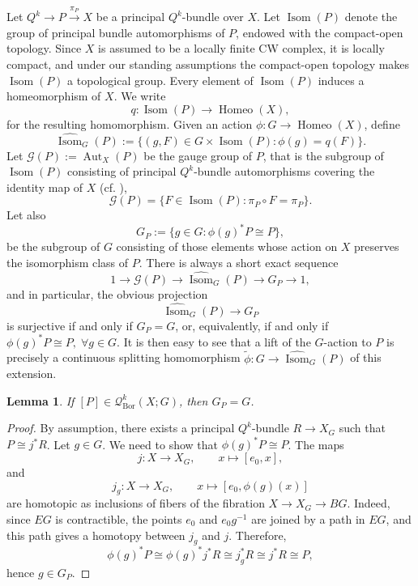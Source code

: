\documentclass[11pt,a4paper]{article}
\numberwithin{equation}{section}
\newtheorem{lemma}[definition]{Lemma}
\theoremstyle{named}
\begin{document}
Let $Q^k\longrightarrow P\overset{\pi_P}{\longrightarrow}X$ be a principal \(Q^k\)-bundle over $X$. Let $\operatorname{Isom}(P)$ denote the group of principal bundle automorphisms of \(P\), endowed with the compact-open topology. Since \(X\) is assumed to be a locally finite CW complex, it is locally compact, and under our standing assumptions the compact-open topology makes \(\operatorname{Isom}(P)\) a topological group. Every element of \(\operatorname{Isom}(P)\) induces a homeomorphism of \(X\). We write
\[
q:\operatorname{Isom}(P)\longrightarrow \operatorname{Homeo}(X),
\]
for the resulting homomorphism. Given an action $\phi:G\longrightarrow \operatorname{Homeo}(X)$,
define
\[
\widehat{\operatorname{Isom}}_G(P)
:=
\{(g,F)\in G\times \operatorname{Isom}(P):\phi(g)=q(F)\}.
\]
Let $\mathcal G(P):=\operatorname{Aut}_X(P)$
be the gauge group of \(P\), that is the subgroup of \(\operatorname{Isom}(P)\) consisting of principal \(Q^k\)-bundle automorphisms covering the identity map of \(X\) (cf. \cite[Chapter 7]{Husemoller}),
\[
\mathcal G(P)=\{F\in\operatorname{Isom}(P):\pi_P\circ F=\pi_P\}.\]
Let also \[
G_P:=
\{g\in G: \phi(g)^*P\cong P\},
\]
be the subgroup of \(G\) consisting of those elements whose action on \(X\) preserves the isomorphism class of \(P\). 
There is always a short exact sequence
\[
1\longrightarrow \mathcal G(P)
\longrightarrow
\widehat{\operatorname{Isom}}_G(P)
\longrightarrow
G_P
\longrightarrow 1,
\]
and in particular, the obvious projection
\[
\widehat{\operatorname{Isom}}_G(P)\longrightarrow G_P
\]
is surjective if and only if \(G_P=G\), or, equivalently, if and only if $\phi(g)^*P\cong P, \;\forall g\in G$. It is then easy to see that a lift of the \(G\)-action to \(P\) is precisely a continuous splitting homomorphism $\widetilde\phi:G\longrightarrow \widehat{\operatorname{Isom}}_G(P)$ of this extension.

\begin{lemma}
\label{lem:borel-implies-invariance}
If $[P]\in \mathcal Q^k_{\mathrm{Bor}}(X;G)$,
then \(G_P=G\).
\end{lemma}

\begin{proof}
By assumption, there exists a principal \(Q^k\)-bundle $R\longrightarrow X_G$
such that $P\cong j^*R$.
Let \(g\in G\). We need to show that $\phi(g)^*P\cong P$.
The maps
\[
j:X\longrightarrow X_G,
\qquad x\longmapsto [e_0,x],
\]
and
\[
j_g:X\longrightarrow X_G, \qquad x\longmapsto [e_0,\phi(g)(x)]
\]
are homotopic as inclusions of fibers of the fibration $X\longrightarrow X_G\longrightarrow BG$.
Indeed, since \(EG\) is contractible, the points \(e_0\) and \(e_0g^{-1}\) are joined by a path in \(EG\), and this path gives a homotopy between \(j_g\) and
\(j\). Therefore,
\[
\phi(g)^*P \cong \phi(g)^*j^*R \cong j_g^*R \cong j^*R \cong P,
\]
hence \(g\in G_P\).
\end{proof}
\end{document}
